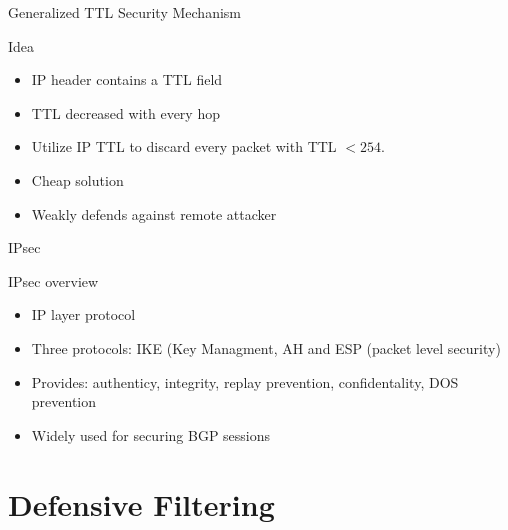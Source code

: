 \documentclass[notes=hide,yellow]{beamer}
\begin{document}
\begin{frame}{Generalized TTL Security Mechanism}
	
	\begin{block}{Idea}
	\begin{itemize}
		\item IP header contains a TTL field 
		\item TTL decreased with every hop
		\item Utilize IP TTL to discard every packet with TTL $< 254$.
		\item Cheap solution
		\item Weakly defends against remote attacker
	\end{itemize}
	\end{block}
\end{frame}
%
\begin{frame}{IPsec}
	\begin{block}{IPsec overview}
	\begin{itemize}
		\item IP layer protocol
		\item Three protocols: IKE (Key Managment, AH and ESP (packet level security)
		\item Provides: authenticy, integrity, replay prevention, confidentality, DOS prevention
		\item Widely used for securing BGP sessions
	\end{itemize}
	\end{block}
\end{frame}
%
\section{Defensive Filtering}
\subsection*{}
\end{document}
